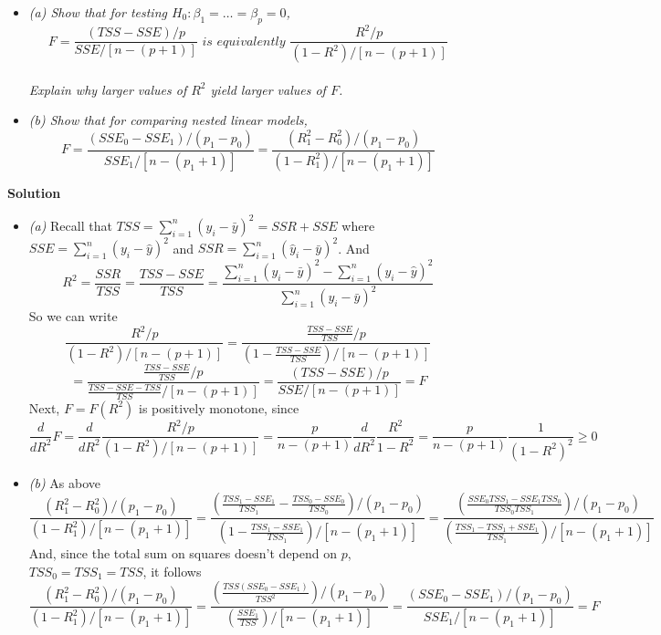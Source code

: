\documentclass[
]{article}
\begin{document}
\begin{itemize}
\item
  \emph{(a) Show that for testing
  \(H_0: \beta_1 = \dots = \beta_p = 0\),}\\
  \[F = \frac{(TSS-SSE)/p}{SSE/[n-(p+1)]} \textit{ is equivalently } \frac{R^2/p}{(1-R^2)/[n-(p+1)]}\]\\
  \emph{Explain why larger values of \(R^2\) yield larger values of
  \(F\).}
\item
  \emph{(b) Show that for comparing nested linear models,}
  \[ F = \frac{(SSE_0-SSE_1)/(p_1-p_0)}{SSE_1/[n-(p_1+1)]} = \frac{(R_1^2 - R_0^2)/(p_1-p_0)}{(1-R_1^2)/[n-(p_1+1)]}\]
\end{itemize}

\textbf{Solution}

\begin{itemize}
\item
  \emph{(a)} Recall that
  \(TSS = \sum_{i=1}^n (y_i - \bar{y})^2 = SSR + SSE\) where
  \(SSE = \sum_{i=1}^n (y_i - \hat{y})^2\) and
  \(SSR = \sum_{i=1}^n (\hat{y}_i - \bar{y})^2\). And
  \[R^2 = \frac{SSR}{TSS} = \frac{TSS-SSE}{TSS} = \frac{\sum_{i=1}^n (y_i - \bar{y})^2 - \sum_{i=1}^n (y_i - \hat{y})^2}{\sum_{i=1}^n (y_i - \bar{y})^2}\]
  So we can write \[
  \frac{R^2/p}{(1-R^2)/[n-(p+1)]}
  =
  \frac{\frac{TSS-SSE}{TSS}/p}{(1-\frac{TSS-SSE}{TSS})/[n-(p+1)]}
  \] \[
  =
  \frac{\frac{TSS-SSE}{TSS}/p}{\frac{TSS-SSE-TSS}{TSS}/[n-(p+1)]}
  =
  \frac{(TSS-SSE)/p}{SSE/[n-(p+1)]}
  = F
  \] Next, \(F=F(R^2)\) is positively monotone, since \[
  \frac{d}{dR^2} F
  =
  \frac{d}{dR^2} \frac{R^2/p}{(1-R^2)/[n-(p+1)]}
  =
  \frac{p}{n-(p+1)} \frac{d}{dR^2} \frac{R^2}{1-R^2}
  =
  \frac{p}{n-(p+1)} \frac{1}{(1-R^2)^2}
  \geq 0
  \]
\item
  \emph{(b)} As above \[
  \frac{(R_1^2 - R_0^2)/(p_1-p_0)}{(1-R_1^2)/[n-(p_1+1)]}
  =
  \frac{\left( \frac{TSS_1-SSE_1}{TSS_1} - \frac{TSS_0-SSE_0}{TSS_0} \right) / (p_1-p_0)}{\left( 1-\frac{TSS_1-SSE_1}{TSS_1} \right)/[n-(p_1+1)]}
  =
  \frac{\left( \frac{SSE_0 TSS_1 - SSE_1 TSS_0}{TSS_0 TSS_1} \right)/(p_1-p_0)}{\left( \frac{TSS_1 - TSS_1 + SSE_1}{TSS_1} \right)/[n-(p_1+1)]}
  \] And, since the total sum on squares doesn't depend on \(p\),
  \(TSS_0=TSS_1=TSS\), it follows \[
  \frac{(R_1^2 - R_0^2)/(p_1-p_0)}{(1-R_1^2)/[n-(p_1+1)]}
  =
  \frac{\left( \frac{TSS(SSE_0-SSE_1)}{TSS^2} \right)/(p_1-p_0)}{\left( \frac{SSE_1}{TSS} \right)/[n-(p_1+1)]}
  =
  \frac{(SSE_0-SSE_1)/(p_1-p_0)}{SSE_1/[n-(p_1+1)]}
  = F
  \]
\end{itemize}
\end{document}
